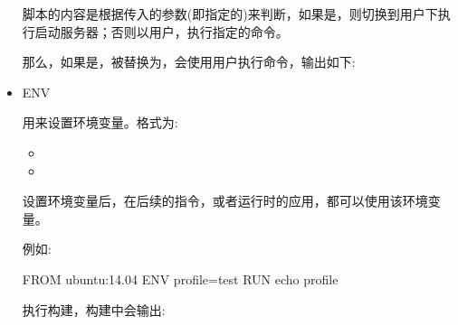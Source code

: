 \documentclass[letterpaper,10pt,english]{sphinxmanual}
\begin{document}
\begin{itemize}
\begin{sphinxVerbatim}[commandchars=\\\{\}]
 
\end{sphinxVerbatim}

脚本的内容是根据传入的参数(即指定的)来判断，如果是，则切换到用户下执行启动服务器；否则以用户，执行指定的命令。

那么，如果是，被替换为，会使用用户执行命令，输出如下:

\begin{sphinxVerbatim}[commandchars=\\\{\}]
  
\end{sphinxVerbatim}

\item {} 
ENV

用来设置环境变量。格式为:
\begin{itemize}
\item {} 

\item {} 

\end{itemize}

设置环境变量后，在后续的指令，或者运行时的应用，都可以使用该环境变量。

例如:

\begin{sphinxVerbatim}[commandchars=\\\{\}]
FROM ubuntu:14.04
ENV profile=test
RUN echo \PYGZdl{}profile
\end{sphinxVerbatim}

执行构建，构建中会输出:


\end{itemize}
\end{document}
